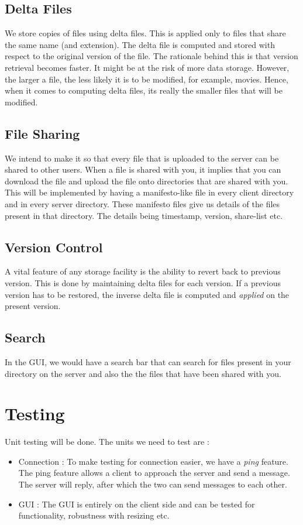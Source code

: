 \documentclass[]{article}
\begin{document}
\subsection{Delta Files}
We store copies of files using delta files. This is applied only to files that share the same name (and extension). The delta file is computed and stored with respect to the original version of the file. The rationale behind this is that version retrieval becomes faster. It might be at the risk of more data storage. However, the larger a file, the less likely it is to be modified, for example, movies. Hence, when it comes to computing delta files, its really the smaller files that will be modified.
\subsection{File Sharing}
We intend to make it so that every file that is uploaded to the server can be shared to other users. When a file is shared with you, it implies that you can download the file and upload the file onto directories that are shared with you. This will be implemented by having a manifesto-like file in every client directory and in every server directory.
These manifesto files give us details of the files present in that directory. The details being timestamp, version, share-list etc.

\subsection{Version Control}
A vital feature of any storage facility is the ability to revert back to previous version. This is done by maintaining delta files for each version. If a previous version has to be restored, the inverse delta file is computed and \textit{applied} on the present version. 

\subsection{Search}
In the GUI, we would have a search bar that can search for files present in your directory on the server and also the the files that have been shared with you.

\section{\LARGE Testing}
Unit testing will be done. The units we need to test are :
\begin{itemize}
\item Connection : To make testing for connection easier, we have a \textit{ping} feature. The ping feature allows a client to approach the server and send a message. The server will reply, after which the two can send messages to each other.
\item GUI : The GUI is entirely on the client side and can be tested for functionality, robustness with resizing etc.

\end{itemize}
\end{document}
